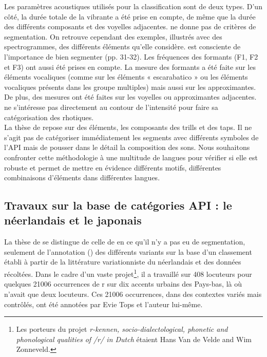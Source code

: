 Les paramètres acoustiques utilisés pour la classification sont de deux types. D'un côté, la durée totale de la vibrante a été prise en compte, de même que la durée des différents composants et des voyelles adjacentes. \citeauthor{blecuaVibrantesEspanolManifestaciones2002} ne donne pas de critères de segmentation. On retrouve cependant des exemples, illustrés avec des spectrogrammes, des différents éléments qu'elle considère. \citeauthor{blecuaVibrantesEspanolManifestaciones2002} est consciente de l'importance de bien segmenter (pp. 31-32).
Les fréquences des formants (F1, F2 et F3) ont aussi été prises en compte. La mesure des formants a été faite sur les éléments vocaliques (comme sur les éléments « escarabatico » ou les éléments vocaliques présents dans les groupe multiples) mais aussi sur les approximantes. De plus, des mesures ont été faites sur les voyelles ou approximantes adjacentes.
\citeauthor{blecuaVibrantesEspanolManifestaciones2002} ne s'intéresse pas directement au contour de l'intensité pour faire sa catégorisation des rhotiques.\\

La thèse de \citeauthor{blecuaVibrantesEspanolManifestaciones2002} repose sur des éléments, les composants des trills et des taps. Il ne s'agit pas de catégoriser immédiatement les segments avec différents symboles de l'API mais de pousser dans le détail la composition des sons. Nous souhaitons confronter cette méthodologie à une multitude de langues pour vérifier si elle est robuste et permet de mettre en évidence différents motifs, différentes combinaisons d'éléments dans différentes langues.

\subsection{Travaux sur la base de catégories API : le néerlandais et le japonais}

La thèse de \textcite{sebregtsSociophoneticsPhonologyDutch2014} se distingue de celle de \citeauthor{blecuaVibrantesEspanolManifestaciones2002} en ce qu'il n'y a pas eu de segmentation, seulement de l'annotation () des différents variants sur la base d'un classement établi à partir de la littérature variationniste du néerlandais et des données récoltées. Dans le cadre d'un vaste projet\footnote{Les porteurs du projet \textit{r-kennen, socio-dialectological, phonetic and phonological qualities of /r/ in Dutch} étaient Hans Van de Velde and Wim Zonneveld.}, il a travaillé sur 408 locuteurs pour quelques 21006 occurrences de r sur dix accents urbains des Pays-bas, là où \citeauthor{blecuaVibrantesEspanolManifestaciones2002} n'avait que deux locuteurs. Ces 21006 occurrences, dans des contextes variés mais contrôlés, ont été annotées par Evie Tops et l'auteur lui-même.\\


